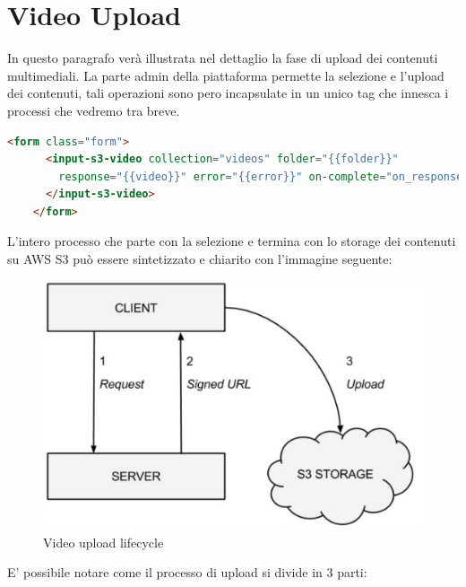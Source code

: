 \section{Video Upload}
\label{sec:video_upload}
In questo paragrafo verà illustrata nel dettaglio la fase di upload dei contenuti multimediali.
La parte admin della piattaforma permette la selezione e l'upload dei contenuti, tali operazioni sono pero incapsulate in un unico tag che innesca i processi che vedremo tra breve. 

\begin{lstlisting}[language=html]
   <form class="form">
      <input-s3-video collection="videos" folder="{{folder}}"
        response="{{video}}" error="{{error}}" on-complete="on_response">
      </input-s3-video>
    </form>
\end{lstlisting}

L'intero processo che parte con la selezione e termina con lo storage dei contenuti su AWS S3 può essere sintetizzato e chiarito con l’immagine seguente:


\begin{figure}[htb]
 \centering
 \includegraphics[width=1.0\linewidth]{images/chapter6/upload.png}\hfill
 \caption[Video upload lifecycle]{Video upload lifecycle}
 \label{fig:fourV}
\end{figure}


E’ possibile notare come il processo di upload si divide in 3 parti: 

